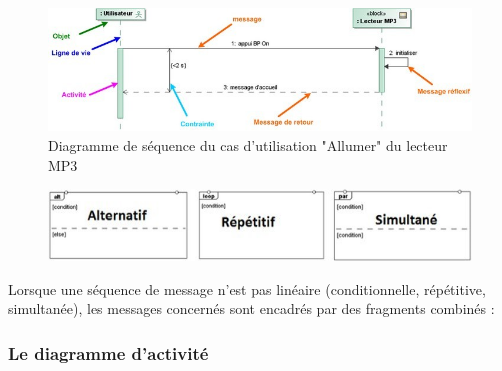\documentclass[12pt,a4paper]{report}
\begin{document}
\begin{figure}[H]
	\centering
	\includegraphics[width=0.8\linewidth]{image21.png}
	\caption{Diagramme de s\'{e}quence du cas d'utilisation "Allumer" du lecteur MP3}
	
\end{figure}
\newpage

\begin{figure}[H]
	\centering
	\includegraphics[width=0.8\linewidth]{image22.png}
	
	
\end{figure}
\noindent \begin{flushleft}
	Lorsque une s\'{e}quence de message n'est pas lin\'{e}aire (conditionnelle, r\'{e}p\'{e}titive, simultan\'{e}e), les messages concern\'{e}s sont encadr\'{e}s par des fragments combin\'{e}s :
	
	\noindent 
\end{flushleft}



\subsubsection{ Le diagramme d'activit\'{e}}
\end{document}
